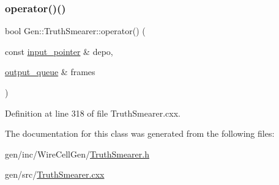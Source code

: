 \subsubsection{\texorpdfstring{operator()()}{operator()()}}
{\footnotesize\ttfamily bool Gen\+::\+Truth\+Smearer\+::operator() (\begin{DoxyParamCaption}\item[{const \hyperlink{class_wire_cell_1_1_i_queuedout_node_acf5f716a764553f3c7055a9cf67e906e}{input\+\_\+pointer} \&}]{depo,  }\item[{\hyperlink{class_wire_cell_1_1_i_queuedout_node_a39018e4e3dd886befac9636ac791a685}{output\+\_\+queue} \&}]{frames }\end{DoxyParamCaption})\hspace{0.3cm}{\ttfamily [virtual]}}



Definition at line 318 of file Truth\+Smearer.\+cxx.



The documentation for this class was generated from the following files\+:\begin{DoxyCompactItemize}
\item 
gen/inc/\+Wire\+Cell\+Gen/\hyperlink{_truth_smearer_8h}{Truth\+Smearer.\+h}\item 
gen/src/\hyperlink{_truth_smearer_8cxx}{Truth\+Smearer.\+cxx}\end{DoxyCompactItemize}
